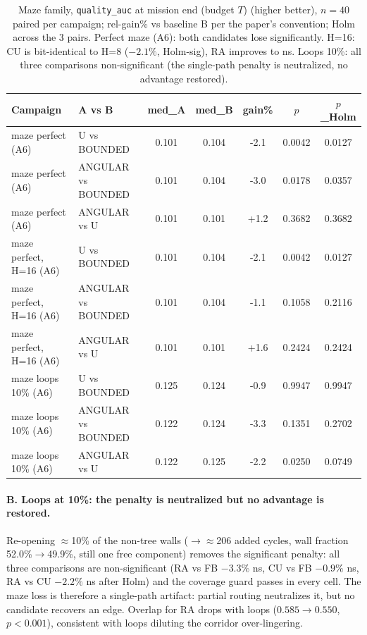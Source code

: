 \documentclass[journal]{IEEEtran}
\begin{document}
\begin{table}[t]
\caption{Maze family, \texttt{quality\_auc} at mission end (budget $T$) (higher better), $n = 40$ paired per campaign; rel-gain\% vs baseline B per the paper's convention; Holm across the 3 pairs. Perfect maze (A6): both candidates lose significantly. H=16: CU is bit-identical to H=8 ($-2.1\%$, Holm-sig), RA improves to ns. Loops 10\%: all three comparisons non-significant (the single-path penalty is neutralized, no advantage restored).}
\label{tab:topo_maze}
\centering
\small
\setlength{\tabcolsep}{4pt}
\begin{tabular}{l l c c c c c}
\toprule
Campaign & A vs B & med\_A & med\_B & gain\% & $p$ & $p$\_Holm \\
\midrule
maze perfect (A6) & U vs BOUNDED & 0.101 & 0.104 & -2.1 & 0.0042 & 0.0127 \\
maze perfect (A6) & ANGULAR vs BOUNDED & 0.101 & 0.104 & -3.0 & 0.0178 & 0.0357 \\
maze perfect (A6) & ANGULAR vs U & 0.101 & 0.101 & +1.2 & 0.3682 & 0.3682 \\
maze perfect, H=16 (A6) & U vs BOUNDED & 0.101 & 0.104 & -2.1 & 0.0042 & 0.0127 \\
maze perfect, H=16 (A6) & ANGULAR vs BOUNDED & 0.101 & 0.104 & -1.1 & 0.1058 & 0.2116 \\
maze perfect, H=16 (A6) & ANGULAR vs U & 0.101 & 0.101 & +1.6 & 0.2424 & 0.2424 \\
maze loops 10\% (A6) & U vs BOUNDED & 0.125 & 0.124 & -0.9 & 0.9947 & 0.9947 \\
maze loops 10\% (A6) & ANGULAR vs BOUNDED & 0.122 & 0.124 & -3.3 & 0.1351 & 0.2702 \\
maze loops 10\% (A6) & ANGULAR vs U & 0.122 & 0.125 & -2.2 & 0.0250 & 0.0749 \\
\bottomrule
\end{tabular}
\end{table}

\paragraph{B. Loops at 10\%: the penalty is neutralized but no advantage is
restored.}
Re-opening $\approx$10\% of the non-tree walls ($\rightarrow \approx$206 added
cycles, wall fraction 52.0\%$\rightarrow$49.9\%, still one free component)
removes the significant penalty: all three comparisons are non-significant (RA
vs FB $-3.3\%$ ns, CU vs FB $-0.9\%$ ns, RA vs CU $-2.2\%$ ns after Holm) and
the coverage guard passes in every cell. The maze loss is therefore a
single-path artifact: partial routing neutralizes it, but no candidate
recovers an edge. Overlap for RA drops with loops ($0.585 \rightarrow 0.550$,
$p < 0.001$), consistent with loops diluting the corridor over-lingering.
\end{document}
